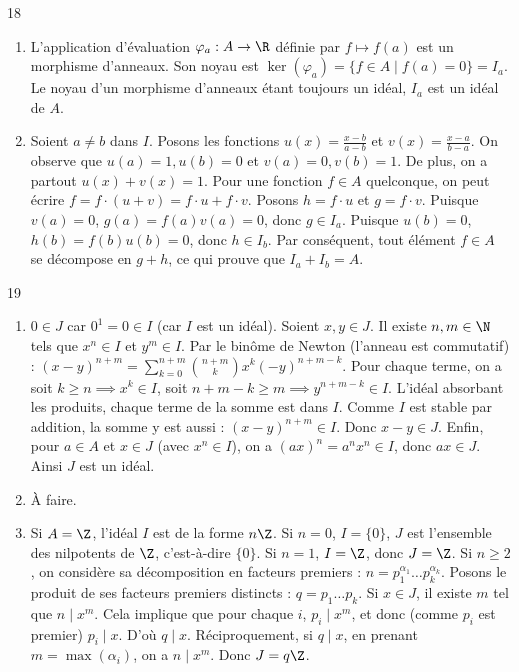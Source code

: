 \begin{correction}{18}
\begin{enumerate}
 \item[a)] L'application d'évaluation $\varphi_a : A \to \R$ définie par $f \mapsto f(a)$ est un morphisme d'anneaux. 
 Son noyau est $\ker(\varphi_a) = \{f \in A \mid f(a) = 0\} = I_a$. 
 Le noyau d'un morphisme d'anneaux étant toujours un idéal, $I_a$ est un idéal de $A$. 
 
 \item[b)] Soient $a \neq b$ dans $I$. Posons les fonctions $u(x) = \frac{x-b}{a-b}$ et $v(x) = \frac{x-a}{b-a}$. 
 On observe que $u(a)=1, u(b)=0$ et $v(a)=0, v(b)=1$. De plus, on a partout $u(x)+v(x)=1$. 
 Pour une fonction $f \in A$ quelconque, on peut écrire $f = f \cdot (u + v) = f \cdot u + f \cdot v$. 
 Posons $h = f \cdot u$ et $g = f \cdot v$. 
 Puisque $v(a) = 0$, $g(a) = f(a)v(a) = 0$, donc $g \in I_a$. 
 Puisque $u(b) = 0$, $h(b) = f(b)u(b) = 0$, donc $h \in I_b$. 
 Par conséquent, tout élément $f \in A$ se décompose en $g+h$, ce qui prouve que $I_a + I_b = A$. 
\end{enumerate}
\end{correction}

\begin{correction}{19}
\begin{enumerate}
 \item $0 \in J$ car $0^1 = 0 \in I$ (car $I$ est un idéal). 
 Soient $x, y \in J$. Il existe $n, m \in \N$ tels que $x^n \in I$ et $y^m \in I$. 
 Par le binôme de Newton (l'anneau est commutatif) : $(x-y)^{n+m} = \sum_{k=0}^{n+m} \binom{n+m}{k} x^k (-y)^{n+m-k}$. 
 Pour chaque terme, on a soit $k \ge n \implies x^k \in I$, soit $n+m-k \ge m \implies y^{n+m-k} \in I$. 
 L'idéal absorbant les produits, chaque terme de la somme est dans $I$. Comme $I$ est stable par addition, la somme y est aussi : $(x-y)^{n+m} \in I$. Donc $x-y \in J$. 
 Enfin, pour $a \in A$ et $x \in J$ (avec $x^n \in I$), on a $(ax)^n = a^n x^n \in I$, donc $ax \in J$. Ainsi $J$ est un idéal. 

 \item À faire.
 
 \item Si $A = \Z$, l'idéal $I$ est de la forme $n\Z$. 
 Si $n=0$, $I=\{0\}$, $J$ est l'ensemble des nilpotents de $\Z$, c'est-à-dire $\{0\}$. 
 Si $n=1$, $I=\Z$, donc $J=\Z$. 
 Si $n \ge 2$, on considère sa décomposition en facteurs premiers : $n = p_1^{\alpha_1} \dots p_k^{\alpha_k}$. 
 Posons le produit de ses facteurs premiers distincts : $q = p_1 \dots p_k$. 
 Si $x \in J$, il existe $m$ tel que $n \mid x^m$. Cela implique que pour chaque $i$, $p_i \mid x^m$, et donc (comme $p_i$ est premier) $p_i \mid x$. D'où $q \mid x$. 
 Réciproquement, si $q \mid x$, en prenant $m = \max(\alpha_i)$, on a $n \mid x^m$. 
 Donc $J = q\Z$. 
\end{enumerate}
\end{correction}

